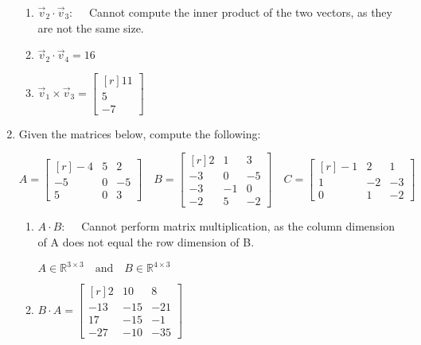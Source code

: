 \documentclass[10pt, oneside, letter]{article}
\begin{document}
\begin{enumerate}
\begin{enumerate}
		\item $\vec{v}_2 \cdot \vec{v}_3: \quad$
		Cannot compute the inner product of the two vectors, as they are not the same size.
		
		\item $\vec{v}_2 \cdot \vec{v}_4 = 16$
		
		\item {$\vec{v}_1 \times \vec{v}_3 = 
		\begin{bmatrix*}[r]
		11 \\ 5 \\ -7
		\end{bmatrix*}$}
		
		\end{enumerate}

	\item Given the matrices below, compute the following:
	
	$$ A = 
	\begin{bmatrix*}[r]
	-4 & 5 & 2 \\ -5 & 0 & -5 \\ 5 & 0 & 3
	\end{bmatrix*}	
	\quad
	B = 
	\begin{bmatrix*}[r]
	2 & 1 & 3 \\ -3 & 0 & -5 \\ -3 & -1 & 0 \\ -2 & 5 & -2
	\end{bmatrix*}	
	\quad
	C = 
	\begin{bmatrix*}[r]
	-1 & 2 & 1 \\ 1 & -2 & -3 \\ 0 & 1 & -2
	\end{bmatrix*}	
	$$		
	
		\begin{enumerate}
		\item $A \cdot B: \quad$
			Cannot perform matrix multiplication, as the column dimension of A does not equal the row dimension of B.
			\begin{center}
			$A \in \mathbb{R}^{3 \times 3} \quad \mbox{and} \quad B \in \mathbb{R}^{4 \times 3}$
			\end{center}
			
		\item $B \cdot A = 
			\begin{bmatrix*}[r]
			2 & 10 & 8 \\ -13 & -15 & -21 \\ 17 & -15 & -1 \\ -27 & -10 & -35
			\end{bmatrix*}
			$
		

\end{enumerate}
\end{enumerate}
\end{document}
